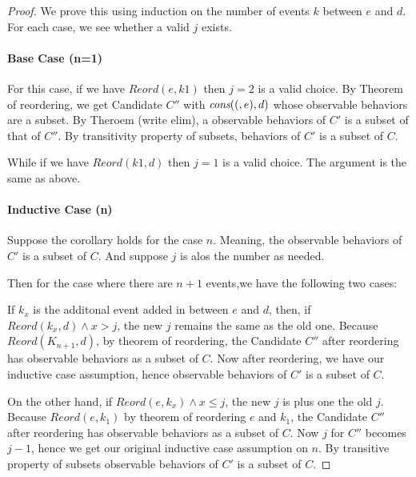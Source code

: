\begin{proof}

    We prove this using induction on the number of events $k$ between $e$ and $d$. For each case, we see whether a valid $j$ exists. 

    \paragraph{Base Case (n=1)}

        For this case, if we have $Reord(e,k1)$ then $j=2$ is a valid choice. By Theorem of reordering, we get Candidate $C''$ with $\textit{cons}((,e),d)$ whose observable behaviors are a subset. By Theroem (write elim), a observable behaviors of $C'$ is a subset of that of $C''$. By transitivity property of subsets, behaviors of $C'$ is a subset of $C$. 
        
    
        While if we have $Reord(k1,d)$ then $j=1$ is a valid choice. The argument is the same as above. 
        
    \paragraph{Inductive Case (n)}
        
        Suppose the corollary holds for the case $n$. Meaning, the observable behaviors of $C'$ is a subset of $C$. And suppose $j$ is alos the number as needed. 

        Then for the case where there are $n+1$ events,we have the following two cases:

        If $k_x$ is the additonal event added in between $e$ and $d$, then, if $Reord(k_x, d) \wedge x>j$, the new $j$ remains the same as the old one. Because $Reord(K_{n+1}, d)$, by theorem of reordering, the Candidate $C''$ after reordering has observable behaviors as a subset of $C$. Now after reordering, we have our inductive case assumption, hence observable behaviors of $C'$ is a subset of $C$. 
        
        On the other hand, if $Reord(e,k_x) \wedge x \leq j$, the new $j$ is plus one the old $j$. Because $Reord(e,k_1)$  by theorem of reordering $e$ and $k_1$, the Candidate $C''$ after reordering has observable behaviors as a subset of $C$. Now $j$ for $C''$ becomes $j-1$, hence we get our original inductive case assumption on $n$. By transitive property of subsets observable behaviors of $C'$ is a subset of $C$. 


    
\end{proof}

